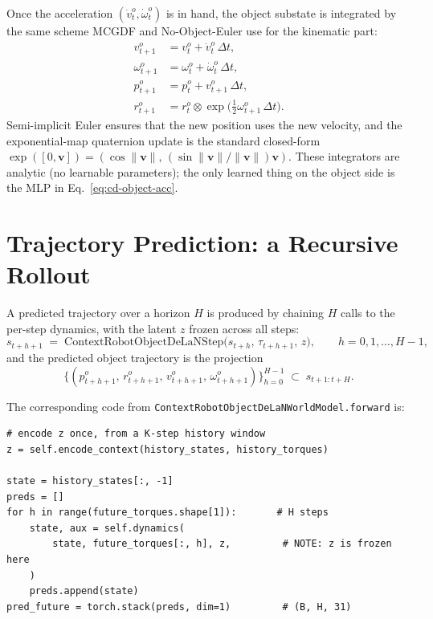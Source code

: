 \documentclass[11pt]{article}
\begin{document}
Once the acceleration $(\dot v^o_t, \dot\omega^o_t)$ is in hand, the
object substate is integrated by the same scheme MCGDF and
No-Object-Euler use for the kinematic part:
\begin{align}
  v^o_{t+1}      &= v^o_t      + \dot v^o_t \,\Delta t, \\
  \omega^o_{t+1} &= \omega^o_t + \dot\omega^o_t \,\Delta t, \\
  p^o_{t+1}      &= p^o_t      + v^o_{t+1} \,\Delta t, \\
  r^o_{t+1}      &= r^o_t \otimes \exp\!\bigl(\tfrac{1}{2}\omega^o_{t+1}\,\Delta t\bigr).
\end{align}
Semi-implicit Euler ensures that the new position uses the new
velocity, and the exponential-map quaternion update is the standard
closed-form
\(\exp([0,\mathbf v]) = (\cos\|\mathbf v\|,\,(\sin\|\mathbf v\|/\|\mathbf v\|)\mathbf v)\).
These integrators are analytic (no learnable parameters); the only
learned thing on the object side is the MLP in
Eq.~\eqref{eq:cd-object-acc}.

\section{Trajectory Prediction: a Recursive Rollout}

A predicted trajectory over a horizon $H$ is produced by chaining $H$
calls to the per-step dynamics, with the latent $z$ frozen across all
steps:
\begin{equation}
  s_{t+h+1} \;=\; \mathrm{ContextRobotObjectDeLaNStep}\bigl(s_{t+h},\,\tau_{t+h+1},\,z\bigr),
  \qquad h = 0, 1, \dots, H-1,
  \label{eq:cd-rollout}
\end{equation}
and the predicted object trajectory is the projection
\begin{equation}
  \bigl\{(p^o_{t+h+1},\, r^o_{t+h+1},\, v^o_{t+h+1},\, \omega^o_{t+h+1})\bigr\}_{h=0}^{H-1}
  \;\subset\; s_{t+1:t+H}.
\end{equation}

The corresponding code from
\texttt{ContextRobotObjectDeLaNWorldModel.forward} is:
\begin{lstlisting}
# encode z once, from a K-step history window
z = self.encode_context(history_states, history_torques)

state = history_states[:, -1]
preds = []
for h in range(future_torques.shape[1]):       # H steps
    state, aux = self.dynamics(
        state, future_torques[:, h], z,         # NOTE: z is frozen here
    )
    preds.append(state)
pred_future = torch.stack(preds, dim=1)         # (B, H, 31)
\end{lstlisting}
\end{document}
